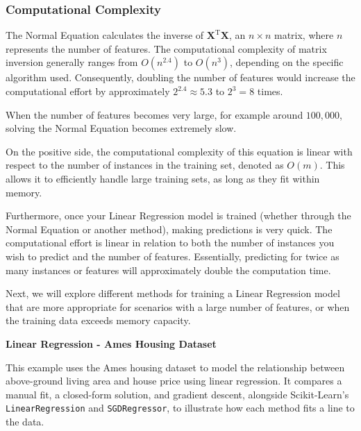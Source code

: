 \documentclass[12pt,letter]{article}
\begin{document}
\subsubsection{Computational Complexity}

The Normal Equation calculates the inverse of $\textbf{X}^\text{T}\textbf{X}$, an $n \times n$ matrix, where $n$ represents the number of features. The computational complexity of matrix inversion generally ranges from $O(n^{2.4})$ to $O(n^3)$, depending on the specific algorithm used. Consequently, doubling the number of features would increase the computational effort by approximately $2^{2.4} \approx 5.3$ to $2^3 = 8$ times.


\begin{mdframed}[middlelinewidth=0.5mm]
\begin{center}
\end{center}
When the number of features becomes very large, for example around $100,000$, solving the Normal Equation becomes extremely slow.
\end{mdframed}



On the positive side, the computational complexity of this equation is linear with respect to the number of instances in the training set, denoted as $O(m)$. This allows it to efficiently handle large training sets, as long as they fit within memory.

Furthermore, once your Linear Regression model is trained (whether through the Normal Equation or another method), making predictions is very quick. The computational effort is linear in relation to both the number of instances you wish to predict and the number of features. Essentially, predicting for twice as many instances or features will approximately double the computation time.

Next, we will explore different methods for training a Linear Regression model that are more appropriate for scenarios with a large number of features, or when the training data exceeds memory capacity.

\begin{example}
\textbf{Linear Regression - Ames Housing Dataset}

\noindent This example uses the Ames housing dataset to model the relationship between above-ground living area and house price using linear regression. It compares a manual fit, a closed-form solution, and gradient descent, alongside Scikit-Learn's \texttt{LinearRegression} and \texttt{SGDRegressor}, to illustrate how each method fits a line to the data.

\end{example}
\end{document}
